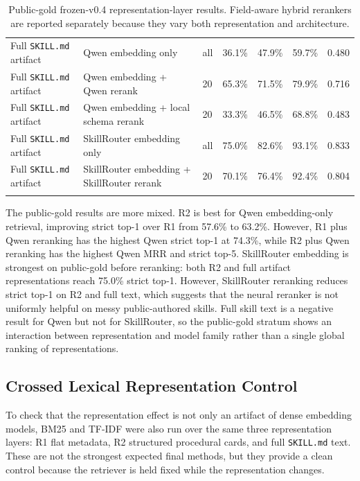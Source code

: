 {\begin{longtable}{@{}p{}p{}p{}rrrr@{}}
Full \texttt{SKILL.md} artifact & Qwen embedding only & all & 36.1\% & 47.9\% & 59.7\% & 0.480 \\
Full \texttt{SKILL.md} artifact & Qwen embedding + Qwen rerank & 20 & 65.3\% & 71.5\% & 79.9\% & 0.716 \\
Full \texttt{SKILL.md} artifact & Qwen embedding + local schema rerank & 20 & 33.3\% & 46.5\% & 68.8\% & 0.483 \\
Full \texttt{SKILL.md} artifact & SkillRouter embedding only & all & 75.0\% & 82.6\% & 93.1\% & 0.833 \\
Full \texttt{SKILL.md} artifact & SkillRouter embedding + SkillRouter rerank & 20 & 70.1\% & 76.4\% & 92.4\% & 0.804 \\
\caption{Public-gold frozen-v0.4 representation-layer results. Field-aware hybrid rerankers are reported separately because they vary both representation and architecture.}
\label{tab:public-representation-first-v04}
\end{longtable}
}

The public-gold results are more mixed. R2 is best for Qwen embedding-only retrieval, improving strict top-1 over R1 from 57.6\% to 63.2\%. However, R1 plus Qwen reranking has the highest Qwen strict top-1 at 74.3\%, while R2 plus Qwen reranking has the highest Qwen MRR and strict top-5. SkillRouter embedding is strongest on public-gold before reranking: both R2 and full artifact representations reach 75.0\% strict top-1. However, SkillRouter reranking reduces strict top-1 on R2 and full text, which suggests that the neural reranker is not uniformly helpful on messy public-authored skills. Full skill text is a negative result for Qwen but not for SkillRouter, so the public-gold stratum shows an interaction between representation and model family rather than a single global ranking of representations.

\subsection{Crossed Lexical Representation Control}

To check that the representation effect is not only an artifact of dense embedding models, BM25 and TF-IDF were also run over the same three representation layers: R1 flat metadata, R2 structured procedural cards, and full \texttt{SKILL.md} text. These are not the strongest expected final methods, but they provide a clean control because the retriever is held fixed while the representation changes.

